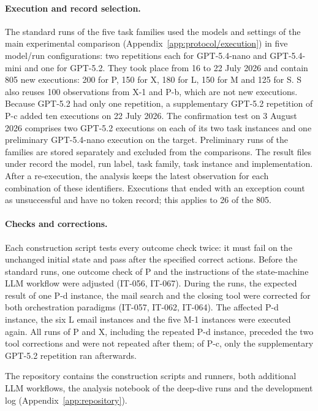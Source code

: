 \paragraph{Execution and record selection.}
The standard runs of the five task families used the models and settings of the main experimental comparison (Appendix~\ref{app:protocol/execution}) in five model/run configurations: two repetitions each for GPT-5.4-nano and GPT-5.4-mini and one for GPT-5.2. They took place from 16 to 22 July 2026 and contain 805 new executions: 200 for P, 150 for X, 180 for L, 150 for M and 125 for S. S also reuses 100 observations from X-1 and P-b, which are not new executions. Because GPT-5.2 had only one repetition, a supplementary GPT-5.2 repetition of P-c added ten executions on 22 July 2026. The confirmation test on 3 August 2026 comprises two GPT-5.2 executions on each of its two task instances and one preliminary GPT-5.4-nano execution on the target. Preliminary runs of the families are stored separately and excluded from the comparisons. The result files under  record the model, run label, task family, task instance and implementation. After a re-execution, the analysis keeps the latest observation for each combination of these identifiers. Executions that ended with an exception count as unsuccessful and have no token record; this applies to 26 of the 805.

\paragraph{Checks and corrections.}
Each construction script tests every outcome check twice: it must fail on the unchanged initial state and pass after the specified correct actions. Before the standard runs, one outcome check of P and the instructions of the state-machine LLM workflow were adjusted (IT-056, IT-067). During the runs, the expected result of one P-d instance, the mail search and the closing tool were corrected for both orchestration paradigms (IT-057, IT-062, IT-064). The affected P-d instance, the six L email instances and the five M-1 instances were executed again. All runs of P and X, including the repeated P-d instance, preceded the two tool corrections and were not repeated after them; of P-c, only the supplementary GPT-5.2 repetition ran afterwards.

The repository contains the construction scripts and runners, both additional LLM workflows, the analysis notebook of the deep-dive runs and the development log (Appendix~\ref{app:repository}).

